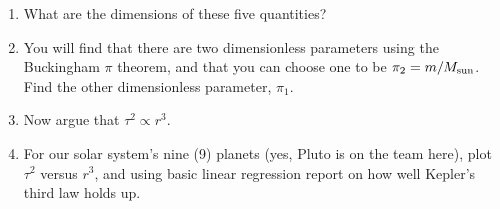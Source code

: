 \begin{enumerate}
  \begin{enumerate}
  \item
    What are the dimensions of these five quantities?
  \item
    You will find that there are two dimensionless parameters
    using the Buckingham $\pi$ theorem, and that you can
    choose one to be $\pi_{2} = m/M_{\textnormal{sun}}$.
    Find the other dimensionless parameter, $\pi_{1}$.
  \item
    Now argue that $\tau^{2} \propto r^{3}$.
  \item
    For our solar system's nine (9) planets (yes, Pluto is on the team here), plot
    $\tau^{2}$ versus $r^{3}$, and using basic linear regression
    report on how well Kepler's third law holds up.
  \end{enumerate}
  
  
   \solutionstart


   \solutionend
  

  
\end{enumerate}
